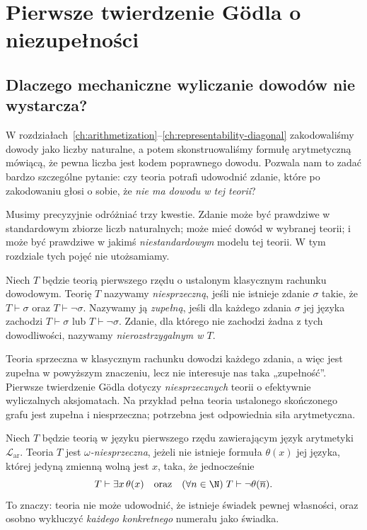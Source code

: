 \chapter{Pierwsze twierdzenie Gödla o niezupełności}\label{ch:first-incompleteness}

\section{Dlaczego mechaniczne wyliczanie dowodów nie wystarcza?}
W rozdziałach~\ref{ch:arithmetization}--\ref{ch:representability-diagonal}
zakodowaliśmy dowody jako liczby naturalne, a potem skonstruowaliśmy
formułę arytmetyczną mówiącą, że pewna liczba jest kodem poprawnego
dowodu. Pozwala nam to zadać bardzo szczególne pytanie: czy teoria
potrafi udowodnić zdanie, które po zakodowaniu głosi o sobie, że
\emph{nie ma dowodu w tej teorii}?

Musimy precyzyjnie odróżniać trzy kwestie. Zdanie może być
prawdziwe w standardowym zbiorze liczb naturalnych; może mieć
dowód w wybranej teorii; i może być prawdziwe w jakimś
\emph{niestandardowym} modelu tej teorii. W tym rozdziale tych
pojęć nie utożsamiamy.

\begin{definicja}\label{def:incomp-properties}
Niech $T$ będzie teorią pierwszego rzędu o ustalonym klasycznym
rachunku dowodowym. Teorię $T$ nazywamy \emph{niesprzeczną},
jeśli nie istnieje zdanie $\sigma$ takie, że
$T\vdash\sigma$ oraz $T\vdash\neg\sigma$.
Nazywamy ją \emph{zupełną}, jeśli dla każdego zdania $\sigma$
jej języka zachodzi $T\vdash\sigma$ lub $T\vdash\neg\sigma$.
Zdanie, dla którego nie zachodzi żadna z tych dowodliwości,
nazywamy \emph{nierozstrzygalnym w $T$}.
\end{definicja}

\begin{uwaga}
Teoria sprzeczna w klasycznym rachunku dowodzi każdego zdania,
a więc jest zupełna w powyższym znaczeniu, lecz nie interesuje
nas taka „zupełność”. Pierwsze twierdzenie Gödla dotyczy
\emph{niesprzecznych} teorii o efektywnie wyliczalnych aksjomatach.
Na przykład pełna teoria ustalonego skończonego grafu jest
zupełna i niesprzeczna; potrzebna jest odpowiednia siła arytmetyczna.
\end{uwaga}

\begin{definicja}\label{def:omega-consistency-incomp}
Niech $T$ będzie teorią w języku pierwszego rzędu
zawierającym język arytmetyki $\mathcal L_{\mathrm{ar}}$.
Teoria $T$ jest \emph{$\omega$-niesprzeczna},
jeżeli nie istnieje formuła $\theta(x)$ jej języka,
której jedyną zmienną wolną jest $x$, taka, że jednocześnie
\[
 T\vdash\exists x\,\theta(x)
 \quad\text{oraz}\quad
 (\forall n\in\N)\;T\vdash\neg\theta(\overline n).
\]
To znaczy: teoria nie może udowodnić, że istnieje
świadek pewnej własności, oraz osobno wykluczyć
\emph{każdego konkretnego} numerału jako świadka.
\end{definicja}

